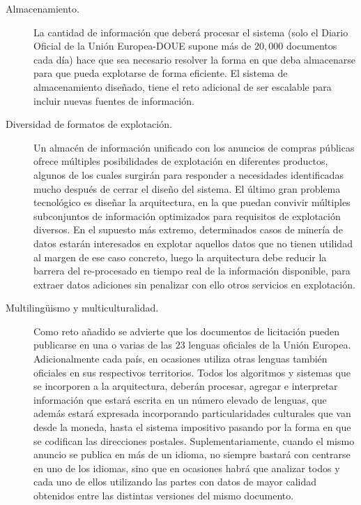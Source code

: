 \documentclass[a4paper,twoside,12pt]{report}
\begin{document}
\begin{description}
\item [Almacenamiento.] La cantidad de información que deberá procesar el sistema (solo el Diario
Oficial de la Unión Europea-\gls{DOUE} supone más de $20,000$ documentos cada día) hace que sea necesario resolver la forma en que
deba almacenarse para que pueda explotarse de forma eficiente. El sistema de
almacenamiento diseñado, tiene el reto adicional de ser escalable para incluir nuevas
fuentes de información.

\item [Diversidad de formatos de explotación.] Un almacén de información unificado con los
anuncios de compras públicas ofrece múltiples posibilidades de explotación en diferentes
productos, algunos de los cuales surgirán para responder a necesidades identificadas mucho
después de cerrar el diseño del sistema. El último gran problema tecnológico es diseñar la
arquitectura, en la que puedan convivir múltiples subconjuntos de información optimizados
para requisitos de explotación diversos. En el supuesto más extremo, determinados casos de
minería de datos estarán interesados en explotar aquellos datos que no tienen utilidad al margen de ese
caso concreto, luego la arquitectura debe reducir la barrera del re-procesado en tiempo real de
la información disponible, para extraer datos adiciones sin penalizar con ello otros servicios en
explotación.

\item [Multiling\"{u}ismo y multiculturalidad.] Como reto añadido se advierte que los documentos de
licitación pueden publicarse en una o varias de las $23$ lenguas oficiales de la Unión Europea.
Adicionalmente cada país, en ocasiones utiliza otras lenguas también oficiales en sus respectivos territorios. Todos
los algoritmos y sistemas que se incorporen a la arquitectura, deberán procesar, agregar e
interpretar información que estará escrita en un número elevado de lenguas, que además
estará expresada incorporando particularidades culturales que van desde la moneda, hasta el
sistema impositivo pasando por la forma en que se codifican las direcciones postales.
Suplementariamente, cuando el mismo anuncio se publica en más de un idioma, no siempre bastará
con centrarse en uno de los idiomas, sino que en ocasiones habrá que analizar todos y cada uno de ellos
utilizando las partes con datos de mayor calidad obtenidos entre las distintas versiones del mismo
documento.
\end{description}
\end{document}
